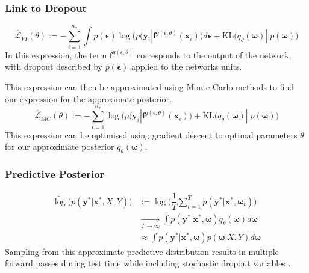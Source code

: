 \documentclass{beamer}
\newcommand{\mb}[1]{\mathbf{#1}}
\begin{document}
\begin{frame}
  \frametitle{Link to Dropout}
  \begin{equation*}
    \hat{\mathcal{L}}_{VI}(\theta) := - \sum_{i=1}^{n_x}\int p(\mb{\epsilon})
    \log\Big( p(\mb{y}_i | \mb{f}^{g(\epsilon, \theta)} (\mb{x}_i) \Big) d\mb{\epsilon} +
    \text{KL}\Big( q_\theta (\mb{\omega}) || p (\mb{\omega}) \Big)
  \end{equation*}
  In this expression, the term $\mb{f}^{g(\epsilon, \theta)}$ corresponds to the output of the network, with dropout described by $p(\mb{\epsilon}) $ applied to the networks units.

  This expression can then be approximated using Monte Carlo methods to find our expression for the approximate posterior.
  \begin{equation*}
    \hat{\mathcal{L}}_{MC}(\theta) := - \sum_{i=1}^{n_x}
    \log\Big( p(\mb{y}_i | \mb{f}^{g(\hat{\epsilon}, \theta)} (\mb{x}_i) \Big)+
    \text{KL}\Big(q_\theta (\mb{\omega}) || p (\mb{\omega}) \Big)
  \end{equation*}
  This expression can be optimised using gradient descent to optimal parameters $\theta$ for our approximate posterior $q_\theta(\mb{\omega})$.
\end{frame}
% 
% 
% 
% 
\begin{frame}
  \frametitle{Predictive Posterior}
  \begin{align*}
    \widetilde{\log} \Bigg( p(\mb{y}^* | \mb{x}^*, X, Y) \Bigg)
    &:=  \log \Big(
      \dfrac{1}{T} \sum_{t=1}^T
      p(\mb{y}^* | \mb{x}^*, \mb{\omega}_t) \Big)
    \\
    &\underset{T \rightarrow \infty}{\longrightarrow} \int p(\mb{y}^* | \mb{x}^*, \mb{\omega})
      q_\theta(\mb{\omega}) d\mb{\omega}
    \\
    & \approx \int p(\mb{y}^* | \mb{x}^*, \mb{\omega})
      p(\mb{\omega} | X,Y)  d\mb{\omega}
  \end{align*}
Sampling from this approximate predictive distribution results in multiple forward passes during test time while including stochastic dropout variables \cite{gal2016}.
\end{frame}
% 
% 
% 
% 
\end{document}
